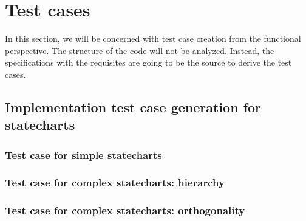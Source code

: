 \chapter{Test cases}
\label{cap:testgen}

In this section, we will be concerned with test case creation from the functional perspective. The structure of the code will not be analyzed. Instead, the specifications with the requisites are going to be the source to derive the test cases.





\section{Implementation test case generation for statecharts}

\subsection{Test case for simple statecharts}

\subsection{Test case for complex statecharts: hierarchy}

\subsection{Test case for complex statecharts: orthogonality}
